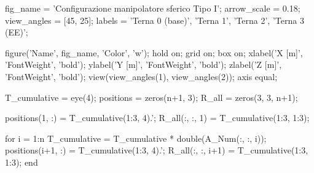 \documentclass[11pt, a4paper]{article}
\begin{document}

\begin{matlabcode}
fig_name    = 'Configurazione manipolatore sferico Tipo I';
arrow_scale = 0.18;
view_angles = [45, 25];
labels      = {'Terna 0 (base)', 'Terna 1', 'Terna 2', 'Terna 3 (EE)'};

figure('Name', fig_name, 'Color', 'w');
hold on;
grid on;
box on;
xlabel('X [m]', 'FontWeight', 'bold');
ylabel('Y [m]', 'FontWeight', 'bold');
zlabel('Z [m]', 'FontWeight', 'bold');
view(view_angles(1), view_angles(2));
axis equal;

T_cumulative = eye(4);
positions = zeros(n+1, 3);
R_all     = zeros(3, 3, n+1);

positions(1, :) = T_cumulative(1:3, 4).';
R_all(:, :, 1)  = T_cumulative(1:3, 1:3);

for i = 1:n
    T_cumulative = T_cumulative * double(A_Num(:, :, i));
    positions(i+1, :) = T_cumulative(1:3, 4).';
    R_all(:, :, i+1)  = T_cumulative(1:3, 1:3);
end
\end{matlabcode}
\newpage
\end{document}
